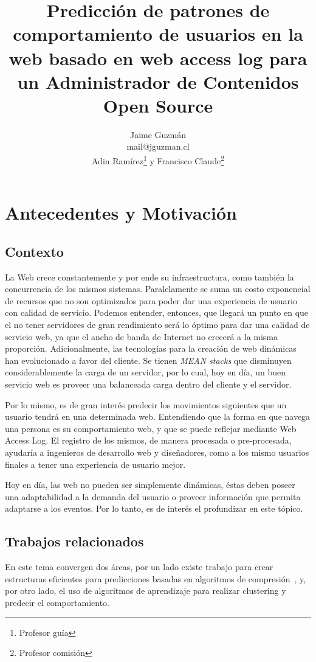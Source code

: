 \documentclass{udparticle}
\title{ Predicción de patrones de comportamiento de usuarios en la web basado en web access log para un Administrador de Contenidos Open Source}
\author{  
  Jaime Guzmán\\{\small\ttfamily mail@jguzman.cl}\protect\\[5pt]%
  {\small Adin Ramírez\thanks{Profesor guía} y Francisco Claude\thanks{Profesor comisión}}%
  }
\begin{document}
\maketitle

\section{Antecedentes y Motivación}

\subsection{Contexto}

  La Web crece constantemente y por ende su infraestructura, como también la concurrencia de los mismos sistemas. 
  Paralelamente se suma un costo exponencial de recursos que no son optimizados para poder dar una experiencia de usuario con calidad de servicio.
  Podemos entender, entonces, que llegará un punto en que el no tener servidores de gran rendimiento será lo óptimo para dar una calidad de servicio web, ya que el ancho de banda de Internet no crecerá a la misma proporción. 
  Adicionalmente, las tecnologías para la creación de web dinámicas han evolucionado a favor del cliente.
  Se tienen \emph{MEAN stacks} que disminuyen considerablemente la carga de un servidor, por lo cual, hoy en día, un buen servicio web es proveer una balanceada carga dentro del cliente y el servidor.

  Por lo mismo, es de gran interés predecir los movimientos siguientes que un usuario tendrá en una determinada web.
  Entendiendo que la forma en que navega una persona es su comportamiento web, y que se puede reflejar mediante Web Access Log. 
  El registro de los mismos, de manera procesada o pre-procesada, ayudaría a ingenieros de desarrollo web y diseñadores, como a los mismo usuarios finales a tener una experiencia de usuario mejor.
  
  Hoy en día, las web no pueden ser simplemente dinámicas, éstas deben poseer una adaptabilidad a la demanda del usuario o proveer información que permita adaptarse a los eventos.
  Por lo tanto, es de interés el profundizar en este tópico.


\subsection{Trabajos relacionados}

En este tema convergen dos áreas, por un lado existe trabajo para crear estructuras eficientes para predicciones basadas en algoritmos de compresión~\cite{BWT}, y, por otro lado, el uso de algoritmos de aprendizaje para realizar clustering y predecir el comportamiento.
\end{document}
